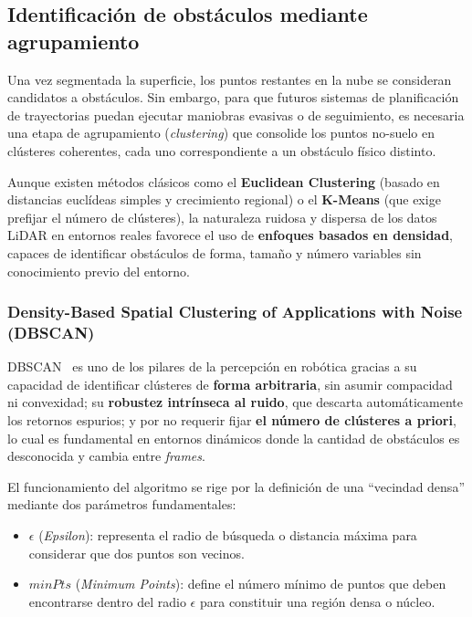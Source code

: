 \subsection{Identificación de obstáculos mediante agrupamiento}
\label{sec:clustering}

Una vez segmentada la superficie, los puntos restantes en la nube se
consideran candidatos a obstáculos. Sin embargo, para que futuros
sistemas de planificación de trayectorias puedan ejecutar maniobras
evasivas o de seguimiento, es necesaria una etapa de agrupamiento
(\textit{clustering}) que consolide los puntos no-suelo en clústeres
coherentes, cada uno correspondiente a un obstáculo físico distinto.

Aunque existen métodos clásicos como el \textbf{Euclidean Clustering}
(basado en distancias euclídeas simples y crecimiento regional) o el
\textbf{K-Means} (que exige prefijar el número de clústeres), la
naturaleza ruidosa y dispersa de los datos LiDAR en entornos reales
favorece el uso de \textbf{enfoques basados en densidad}, capaces de
identificar obstáculos de forma, tamaño y número variables sin
conocimiento previo del entorno.

\subsubsection{Density-Based Spatial Clustering of Applications with Noise (DBSCAN)}
\label{sec:dbscan}

DBSCAN~\cite{yabroudi2022dbscan} es uno de los pilares de la percepción
en robótica gracias a su capacidad de identificar clústeres de
\textbf{forma arbitraria}, sin asumir compacidad ni convexidad; su
\textbf{robustez intrínseca al ruido}, que descarta automáticamente los
retornos espurios; y por no requerir fijar \textbf{el número de
clústeres a priori}, lo cual es fundamental en entornos dinámicos donde
la cantidad de obstáculos es desconocida y cambia entre
\textit{frames}.

El funcionamiento del algoritmo se rige por la definición de una
\enquote{vecindad densa} mediante dos parámetros fundamentales:

\begin{itemize}
    \item $\epsilon$ (\textit{Epsilon}): representa el radio de
    búsqueda o distancia máxima para considerar que dos puntos son
    vecinos.
    \item $\mathit{minPts}$ (\textit{Minimum Points}): define el número
    mínimo de puntos que deben encontrarse dentro del radio $\epsilon$
    para constituir una región densa o núcleo.
\end{itemize}

